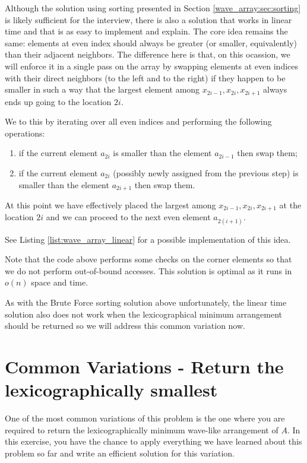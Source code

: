 Although the solution using sorting presented in Section \ref{wave_array:sec:sorting} is likely sufficient for the interview, there is also a solution that works in linear time and that is as easy to
implement and explain. The core idea remains the same: elements at even index should always be
greater (or smaller, equivalently) than their adjacent neighbors. The difference here is that, on this ocassion,  we will enforce it in a single pass on the array by
swapping elements at even indices with their direct neighbors (to the left and to the right) if they happen to be smaller in such a way that the largest element among  $x_{2i-1},x_{2i},x_{2i+1}$ always ends up going to the location $2i$.

We to this by iterating over all even indices and performing the following operations:
\begin{enumerate}
	\item if the current element $a_{2i}$ is smaller than the element $a_{2i-1}$ then swap them; 
	\item if the current element $a_{2i}$ (possibly newly assigned from the previous step) is smaller than the element $a_{2i+1}$ then swap them.
\end{enumerate}
At this point we have effectively placed the largest among $x_{2i-1},x_{2i},x_{2i+1}$ at the location $2i$ and we can proceed to the next even element $a_{2(i+1)}$. 

See Listing \ref{list:wave_array_linear} for a possible implementation of this idea.



Note that the code above performs some checks on the corner elements so that we do not perform out-of-bound accesses.
This solution is optimal as it runs in $o(n)$ space and time. 

As with the Brute Force sorting solution above unfortunately, the linear time solution also does not work when the lexicographical minimum arrangement should be returned so we will address this common variation now. 

\section{Common Variations - Return the lexicographically smallest}
\label{sec:wave-array:smallest}

One of the most common variations of this problem is the one where you are required to return the lexicographically minimum wave-like arrangement of $A$. In this exercise, you have the chance to apply everything we have learned about this problem so far and write an efficient solution for this variation.

